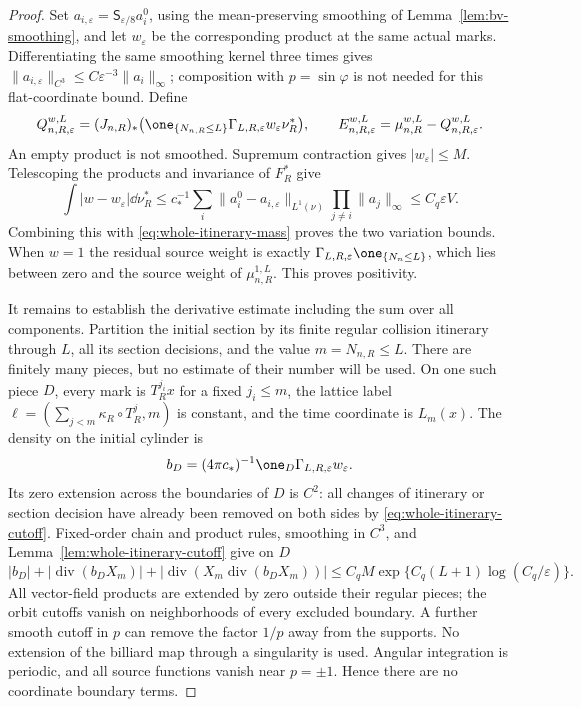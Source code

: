\begin{proof}
Set $a_{i,\varepsilon}=\mathsf S_{\varepsilon/8}a_i^0$, using the
mean-preserving smoothing of Lemma~\ref{lem:bv-smoothing}, and let
$w_\varepsilon$ be the corresponding product at the same actual marks.
Differentiating the same smoothing kernel three times gives
$\|a_{i,\varepsilon}\|_{C^3}\le C\varepsilon^{-3}\|a_i\|_\infty$;
composition with $p=\sin\varphi$ is not needed for this flat-coordinate bound.
Define
\begin{equation}\label{eq:geometric-residual-definition}
 Q_{n,R,\varepsilon}^{w,L}=(J_{n,R})_*
 \bigl(\one_{\{N_{n,R}\le L\}}\Gamma_{L,R,\varepsilon}
                                     w_\varepsilon\nu_R^*\bigr),
 \qquad E_{n,R,\varepsilon}^{w,L}=\mu_{n,R}^{w,L}-Q_{n,R,\varepsilon}^{w,L}.
\end{equation}
An empty product is not smoothed. Supremum contraction gives
$|w_\varepsilon|\le M$. Telescoping the products and invariance of
$F_R^*$ give
\[
 \int|w-w_\varepsilon|\dd\nu_R^*
 \le c_*^{-1}\sum_i\|a_i^0-a_{i,\varepsilon}\|_{L^1(\nu)}
                        \prod_{j\ne i}\|a_j\|_\infty
 \le C_q\varepsilon V.
\]
Combining this with \eqref{eq:whole-itinerary-mass} proves the two
variation bounds. When $w=1$ the residual source weight is exactly
$\Gamma_{L,R,\varepsilon}\one_{\{N_n\le L\}}$, which lies between zero
and the source weight of $\mu^{1,L}_{n,R}$. This proves positivity.

It remains to establish the derivative estimate including the sum over
all components. Partition the initial section by its finite regular
collision itinerary through $L$, all its section decisions, and the
value $m=N_{n,R}\le L$. There are finitely many pieces, but no estimate
of their number will be used. On one such piece $D$, every mark is
$T_R^{j_i}x$ for a fixed $j_i\le m$, the lattice label
$\ell=(\sum_{j<m}\kappa_R\circ T_R^j,m)$ is constant, and the time
coordinate is $L_m(x)$. The density on the initial cylinder is
\[
 b_D=(4\pi c_*)^{-1}\one_D\Gamma_{L,R,\varepsilon}w_\varepsilon.
\]
Its zero extension across the boundaries of $D$ is $C^2$: all changes
of itinerary or section decision have already been removed on both
sides by \eqref{eq:whole-itinerary-cutoff}. Fixed-order chain and product
rules, smoothing in $C^3$, and Lemma~\ref{lem:whole-itinerary-cutoff}
give on $D$
\begin{equation}\label{eq:geometric-divergence-bound}
 |b_D|+|\operatorname{div}(b_DX_m)|+
 |\operatorname{div}(X_m\operatorname{div}(b_DX_m))|
       \le C_qM\exp\{C_q(L+1)\log(C_q/\varepsilon)\}.
\end{equation}
All vector-field products are extended by zero outside their regular
pieces; the orbit cutoffs vanish on neighborhoods of every excluded
boundary. A further smooth cutoff in $p$ can remove the factor $1/p$
away from the supports. No extension of the billiard map through a
singularity is used.
Angular integration is periodic, and all source functions vanish near
$p=\pm1$. Hence there are no coordinate boundary terms.


\end{proof}
